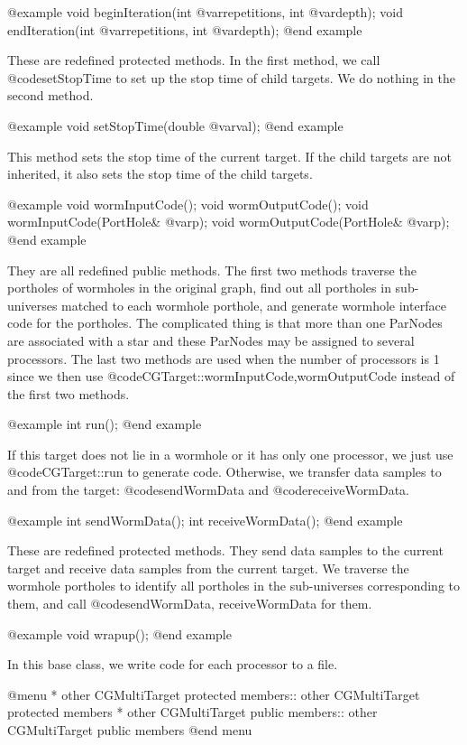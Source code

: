 @example
void beginIteration(int @var{repetitions}, int @var{depth});
void endIteration(int @var{repetitions}, int @var{depth});
@end example

These are redefined protected methods. In the first method, we call
@code{setStopTime} to set up the stop time of child targets.
We do nothing in the second method.

@example
void setStopTime(double @var{val});
@end example

This method sets the stop time of the current target. If the child
targets are not inherited, it also sets the stop time of the
child targets.

@example
void wormInputCode();
void wormOutputCode();
void wormInputCode(PortHole& @var{p});
void wormOutputCode(PortHole& @var{p});
@end example

They are all redefined public methods. The first two methods traverse
the portholes of wormholes in the original graph, find out all
portholes in sub-universes matched to each wormhole porthole, and generate
wormhole interface code for the portholes.
The complicated thing is that
more than one ParNodes are associated with a star and these ParNodes
may be assigned to several processors.
The last two methods are used when the number of processors is 1 since we
then use @code{CGTarget::wormInputCode,wormOutputCode} instead of the first
two methods.
 
@example
int run();
@end example

If this target does not lie in a wormhole or it has only one processor,
we just use @code{CGTarget::run} to generate code.
Otherwise, we transfer data samples to and from the target:
@code{sendWormData} and @code{receiveWormData}.

@example
int sendWormData();
int receiveWormData();
@end example

These are redefined protected methods. They send data samples to the current
target and receive data samples from the current target. We traverse the
wormhole portholes to identify all portholes in the sub-universes 
corresponding to them, and call @code{sendWormData, receiveWormData} for them.

@example
void wrapup();
@end example

In this base class, we write code for each processor to a file.
 
@menu
* other CGMultiTarget protected members:: other CGMultiTarget protected members
* other CGMultiTarget public members::	  other CGMultiTarget public members
@end menu

